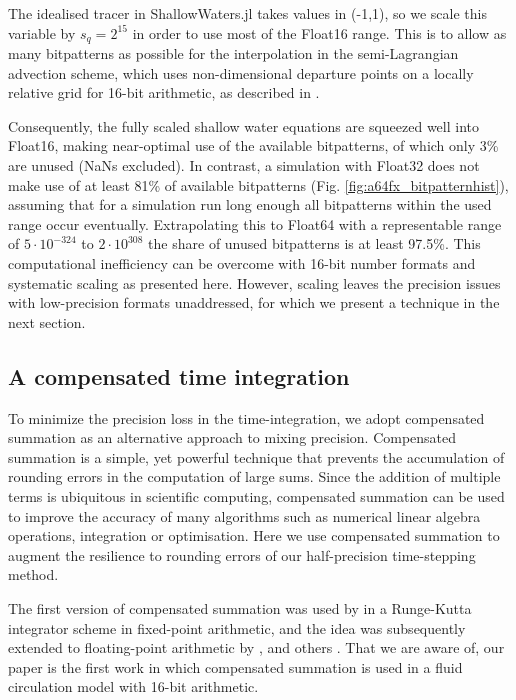 The idealised tracer in ShallowWaters.jl takes values in (-1,1), so we scale this variable by $s_q = 2^{15}$
in order to use most of the Float16 range. This is to allow as many bitpatterns as possible for the interpolation
in the semi-Lagrangian advection scheme, which uses non-dimensional departure points on a locally relative
grid for 16-bit arithmetic, as described in \cite{Klower2020a}.

Consequently, the fully scaled shallow water equations are squeezed well into Float16, making near-optimal
use of the available bitpatterns, of which only 3\% are unused (NaNs excluded). In contrast, a simulation with
Float32 does not make use of at least 81\% of available bitpatterns (Fig. \ref{fig:a64fx_bitpatternhist}), assuming
that for a simulation run long enough all bitpatterns within the used range occur eventually. Extrapolating this
to Float64 with a representable range of $5 \cdot 10^{-324}$ to $2 \cdot 10^{308}$ the share of unused bitpatterns
is at least 97.5\%. This computational inefficiency can be overcome with 16-bit number formats and systematic
scaling as presented here. However, scaling leaves the precision issues with low-precision formats unaddressed,
for which we present a technique in the next section.

\subsection{A compensated time integration}
\label{sec:compensated_time_integration}

To minimize the precision loss in the time-integration, we adopt compensated summation as an alternative approach
to mixing precision. Compensated summation is a simple, yet powerful technique that prevents the accumulation of
rounding errors in the computation of large sums. Since the addition of multiple terms is ubiquitous in scientific computing,
compensated summation can be used to improve the accuracy of many algorithms such as numerical linear algebra
operations, integration or optimisation. Here we use compensated summation to augment the resilience to rounding
errors of our half-precision time-stepping method. 

The first version of compensated summation was used by \cite{Gill1951} in a Runge-Kutta integrator scheme in
fixed-point arithmetic, and the idea was subsequently extended to floating-point arithmetic by \cite{Kahan1965},
\cite{Moller1965} and others \citep{Vitasek1969,Linnainmaa1974,Higham1993}. That we are aware of, our paper
is the first work in which compensated summation is used in a fluid circulation model with 16-bit arithmetic.

